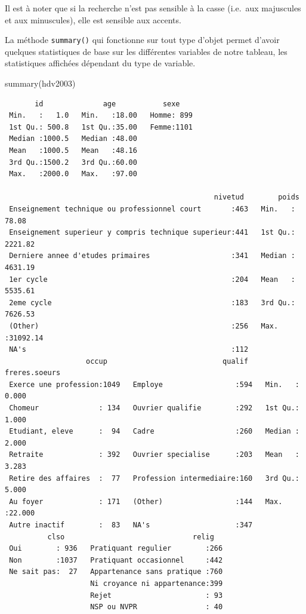 \documentclass[
  letterpaper,
  DIV=11,
  numbers=noendperiod,
  oneside]{scrreprt}
\newenvironment{Shaded}{\begin{snugshade}}{\end{snugshade}}
\newcommand{\FunctionTok}[1]{\textcolor[rgb]{0.28,0.35,0.67}{#1}}
\newcommand{\NormalTok}[1]{\textcolor[rgb]{0.00,0.23,0.31}{#1}}
\begin{document}
Il est à noter que si la recherche n'est pas sensible à la casse
(i.e.~aux majuscules et aux minuscules), elle est sensible aux accents.

La méthode \texttt{summary()} qui fonctionne sur tout type d'objet
permet d'avoir quelques statistiques de base sur les différentes
variables de notre tableau, les statistiques affichées dépendant du type
de variable.

\begin{Shaded}
\begin{Highlighting}[]
\FunctionTok{summary}\NormalTok{(hdv2003)}
\end{Highlighting}
\end{Shaded}

\begin{verbatim}
       id              age           sexe     
 Min.   :   1.0   Min.   :18.00   Homme: 899  
 1st Qu.: 500.8   1st Qu.:35.00   Femme:1101  
 Median :1000.5   Median :48.00               
 Mean   :1000.5   Mean   :48.16               
 3rd Qu.:1500.2   3rd Qu.:60.00               
 Max.   :2000.0   Max.   :97.00               
                                              
                                                 nivetud        poids         
 Enseignement technique ou professionnel court       :463   Min.   :   78.08  
 Enseignement superieur y compris technique superieur:441   1st Qu.: 2221.82  
 Derniere annee d'etudes primaires                   :341   Median : 4631.19  
 1er cycle                                           :204   Mean   : 5535.61  
 2eme cycle                                          :183   3rd Qu.: 7626.53  
 (Other)                                             :256   Max.   :31092.14  
 NA's                                                :112                     
                   occup                           qualif    freres.soeurs   
 Exerce une profession:1049   Employe                 :594   Min.   : 0.000  
 Chomeur              : 134   Ouvrier qualifie        :292   1st Qu.: 1.000  
 Etudiant, eleve      :  94   Cadre                   :260   Median : 2.000  
 Retraite             : 392   Ouvrier specialise      :203   Mean   : 3.283  
 Retire des affaires  :  77   Profession intermediaire:160   3rd Qu.: 5.000  
 Au foyer             : 171   (Other)                 :144   Max.   :22.000  
 Autre inactif        :  83   NA's                    :347                   
          clso                              relig    
 Oui        : 936   Pratiquant regulier        :266  
 Non        :1037   Pratiquant occasionnel     :442  
 Ne sait pas:  27   Appartenance sans pratique :760  
                    Ni croyance ni appartenance:399  
                    Rejet                      : 93  
                    NSP ou NVPR                : 40  
                                                     

\end{verbatim}
\end{document}
